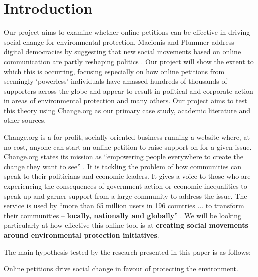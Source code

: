 \section{Introduction}
\label{sec:introduction}
Our project aims to examine whether online petitions can be effective in driving social change for environmental protection. Macionis and Plummer address digital democracies by suggesting that new social movements based on online communication are partly reshaping politics \citep[Chap. 23]{Plummer11}. Our project will show the extent to which this is occurring, focusing especially on how online petitions from seemingly `powerless' individuals have amassed hundreds of thousands of supporters across the globe and appear to result in political and corporate action in areas of environmental protection and many others. Our project aims to test this theory using Change.org as our primary case study, academic literature and other sources.\par\vspace{0.2cm}

Change.org is a for-profit, socially-oriented business running a website where, at no cost, anyone can start an online-petition to raise support on for a given issue. Change.org states its mission as ``empowering people everywhere to create the change they want to see'' \citep{Change14a}.  It is tackling the problem of how communities can speak to their politicians and economic leaders. It gives a voice to those who are experiencing the consequences of government action or economic inequalities to speak up and garner support from a large community to address the issue. The service is used by ``more than 65 million users in 196 countries ... to transform their communities -- \textbf{locally, nationally and globally}'' \citep{Change14a}.  We will be looking particularly at how effective this online tool is at \textbf{creating social movements around environmental protection initiatives}.\par\vspace{0.2cm}

The main hypothesis tested by the research presented in this paper is as follows:

\begin{hyp}
\item Online petitions drive social change in favour of protecting the environment.
\end{hyp}

